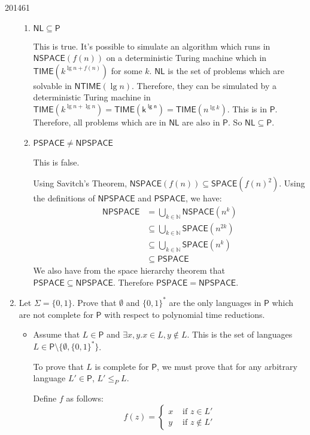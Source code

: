 \documentclass[10pt,\jkfside,a4paper]{article}
\begin{document}
\begin{examquestion}{2014}{6}{1}
\begin{enumerate}[label=(\alph*)]
\begin{enumerate}[label=(\roman*)]
\item $\mathsf{NL} \subseteq \mathsf{P}$

This is true. It's possible to simulate an algorithm which runs in
$\mathsf{NSPACE}(f(n))$ on a deterministic Turing machine which in
$\mathsf{TIME}(k^{\lg n + f(n)})$ for some $k$. $\mathsf{NL}$ is the set of
problems which are solvable in $\mathsf{NTIME}(\lg n)$. Therefore, they can
be simulated by a deterministic Turing machine in $\mathsf{TIME}(k^{\lg n +
\lg n}) = \mathsf{TIME(k^{\lg n})} = \mathsf{TIME}(n^{\lg k})$. This is in
$\mathsf{P}$. Therefore, all problems which are in $\mathsf{NL}$ are
also in $\mathsf{P}$. So $\mathsf{NL} \subseteq \mathsf{P}$.

\item $\mathsf{PSPACE} \neq \mathsf{NPSPACE}$

This is false.

Using Savitch's Theorem, $\mathsf{NSPACE}(f(n)) \subseteq \mathsf{SPACE}(f
(n)^2)$. Using the definitions of $\mathsf{NPSPACE}$ and $\mathsf{PSPACE}$,
we have:
\begin{align*}
\mathsf{NPSPACE} &= \bigcup_{k \in \mathbb N} \mathsf{NSPACE}(n^k) \\
&\subseteq \bigcup_{k \in \mathbb N} \mathsf{SPACE}(n^{2k}) \\
&\subseteq \bigcup_{k \in \mathbb N} \mathsf{SPACE}(n^{k}) \\
&\subseteq \mathsf{PSPACE}
\end{align*}
We also have from the space hierarchy theorem that $\mathsf{PSPACE} \subseteq
\mathsf{NPSPACE}$. Therefore $\mathsf{PSPACE} = \mathsf{NPSPACE}$.

\end{enumerate}

\item Let $\Sigma = \{0, 1\}$. Prove that $\emptyset$ and $\{0, 1\}^*$ are the
only languages in $\mathsf{P}$ which are not complete for $\mathsf{P}$ with
respect to polynomial time reductions.

\begin{itemize}

\item Assume that $L \in \mathsf P$ and $\exists x, y. x \in L, y \notin L$.
This is the set of languages $L \in \mathsf P \setminus \{\emptyset,
\{0, 1\}^*\}$.

To prove that $L$ is complete for $\mathsf P$, we must prove that for any
arbitrary language $L' \in \mathsf{P}$, $L' \le_P L$.

Define $f$ as follows:
\[
f(z) =
\begin{cases}
x & \text{ if } z \in L' \\
y & \text{ if } z \notin L'
\end{cases}
\]


\end{itemize}
\end{enumerate}
\end{examquestion}
\end{document}
